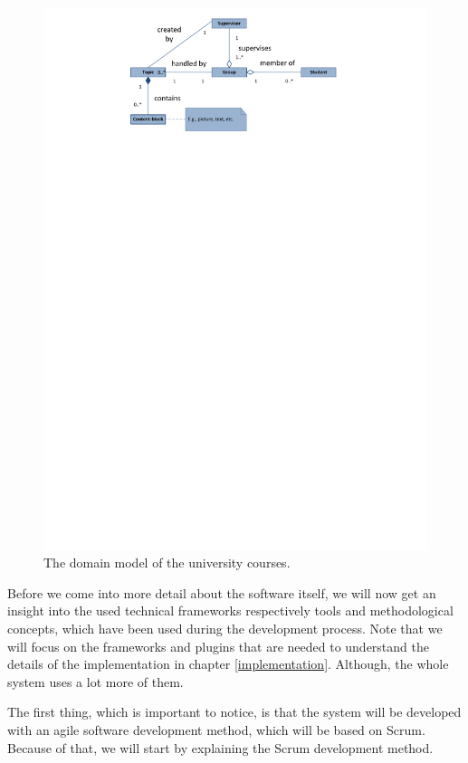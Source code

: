 \begin{figure}[th]
\centerline{\includegraphics[width=1\textwidth]{gfx/domainModel.pdf}}
\caption{The domain model of the university courses.}
\label{domain}
\end{figure}

Before we come into more detail about the software itself, we will now get an insight into the used technical frameworks respectively tools and methodological concepts, which have been used during the development process.  Note that we will focus on the frameworks and plugins that are needed to understand the details of the implementation in chapter \ref{implementation}. Although, the whole system uses a lot more of them.

The first thing, which is important to notice, is that the system will be developed with an agile software development method, which will be based on Scrum. Because of that, we will start by explaining the Scrum development method.

